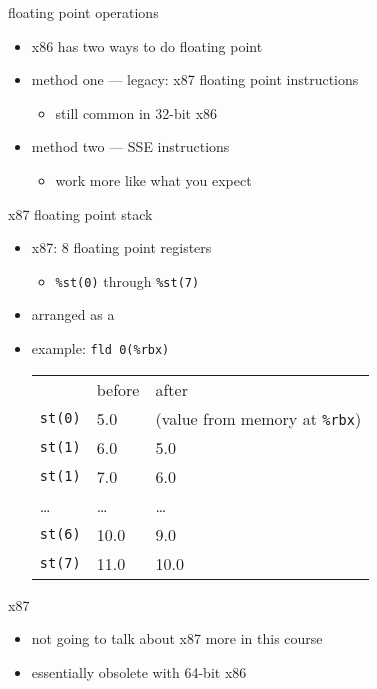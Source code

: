 \begin{frame}{floating point operations}
    \begin{itemize}
    \item x86 has two ways to do floating point
    \item method one --- legacy: x87 floating point instructions
        \begin{itemize}
        \item still common in 32-bit x86
        \end{itemize}
    \item method two --- SSE instructions
        \begin{itemize}
        \item work more like what you expect
        \end{itemize}
    \end{itemize}
\end{frame}

\begin{frame}[fragile,label=x87Stack]{x87 floating point stack}
    \begin{itemize}
    \item x87: 8 floating point registers
        \begin{itemize}
        \item {\tt \%st(0)} through {\tt \%st(7)}
        \end{itemize}
    \item arranged as a 
    \item example: \lstinline|fld 0(%rbx)| 
        \begin{tabular}{l@{: }ll}
        ~ & before & after \\
        {\tt st(0)} & 5.0 & (value from memory at {\tt \%rbx}) \\
        {\tt st(1)} & 6.0 & 5.0 \\
        {\tt st(1)} & 7.0 & 6.0 \\
        \ldots      & \ldots & \ldots \\
        {\tt st(6)} & 10.0 & 9.0 \\
        {\tt st(7)} & 11.0 & 10.0 \\
        \end{tabular}
    \end{itemize}
\end{frame}

\begin{frame}{x87}
    \begin{itemize}
    \item not going to talk about x87 more in this course
    \item essentially obsolete with 64-bit x86
    \end{itemize}
\end{frame}

